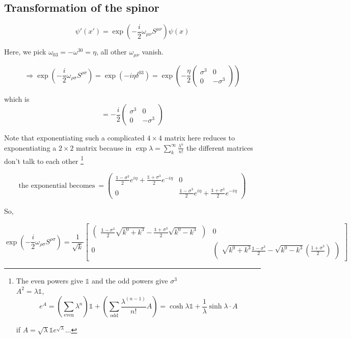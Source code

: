 \documentclass[11pt]{article}
\begin{document}
	\subsection*{Transformation of the spinor}
	
		\[ \psi'(x') = \exp(-\frac{i}{2} 
		\omega_{\mu\nu} S^{\mu\nu})\psi(x)\]
	
	
	Here, we pick $\omega_{03} = -\omega^{30} = \eta$, all other $\omega_{\mu\nu}$ vanish.
	
	\[ \Rightarrow \exp \left(-\frac{i}{2} \omega_{\rho\sigma} S^{\rho \sigma}\right) = \exp(-i\eta\delta^{03}) = \exp\left(-\frac{\eta}{2}\begin{pmatrix}
		\sigma^3 & 0\\ 0 & -\sigma^3
	\end{pmatrix}\right)\]

which is $$ = -\frac{i}{2}\begin{pmatrix}
	\sigma^3 & 0 \\ 0 & - \sigma^3
\end{pmatrix}$$

Note that exponentiating such a complicated $4\times 4$ matrix here reduces to exponentiating a $2\times2$ matrix because in $\exp \lambda = \sum_k^\infty \frac{\lambda^n}{
n!}$ the different matrices don't talk to each other \footnote{
	The even powers give $\mathbb{1}$ and the odd powers give $\sigma^3$\\

 $A^2 = \lambda\mathbb{1}$, $$e^{A} = \left( \sum_{\text{even}} \lambda^{n} \right) \mathbb{1} + \left(\sum_{\text{odd}} \frac{\lambda^{(n-1)}}{n!}A \right)= \cosh \lambda \mathbb{1} + \frac{1}{\lambda}\sinh \lambda \cdot A$$

if $A = \sqrt{\lambda} \mathbb{1} e^{\sqrt{\lambda}}$...

	}
	
	\[ \text{the exponential becomes}\ = \begin{pmatrix} \frac{\mathbb{1}-\sigma^3}{2}e^{i\eta}  + \frac{\mathbb{1}+\sigma^3}{2}e^{-i\eta}  & 0 \\
		 0 &  \frac{\mathbb{1}-\sigma^3}{2}e^{i\eta} +  \frac{\mathbb{1}+\sigma^3}{2}e^{-i\eta} \end{pmatrix}\]
	
	
	So, 
	
	\[ \exp\left(-\frac{i}{2} \omega_{\rho\sigma} S^{\rho\sigma} \right) 
		= 	\frac{1}{\sqrt{k}}
	\begin{bmatrix}
		 \begin{pmatrix}
			\frac{\mathbb{1}-\sigma^3}{2}\sqrt{k^0 + k^3}  - \frac{\mathbb{1}+\sigma^3}{2}\sqrt{k^0 - k^3} 
		\end{pmatrix} & 0 \\
		
		0 & \begin{pmatrix}
			\sqrt{k^0 + k^3} \frac{\mathbb{1} - \sigma^3}{2} - \sqrt{k^0 - k^3}\left(\frac{1 + \sigma^3}{2}\right)
		\end{pmatrix}
	\end{bmatrix}
	\]
	
\end{document}
